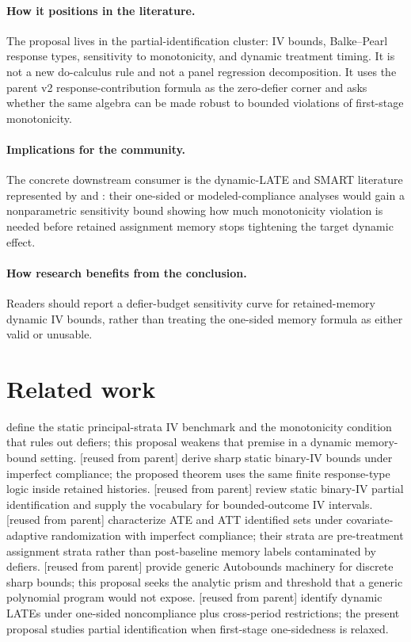\documentclass[11pt]{article}
\theoremstyle{definition}
\theoremstyle{plain}
\theoremstyle{remark}
\begin{document}
\paragraph{How it positions in the literature.}
The proposal lives in the partial-identification cluster: IV bounds, Balke--Pearl response types, sensitivity to monotonicity, and dynamic treatment timing.  It is not a new do-calculus rule and not a panel regression decomposition.  It uses the parent v2 response-contribution formula as the zero-defier corner and asks whether the same algebra can be made robust to bounded violations of first-stage monotonicity.

\paragraph{Implications for the community.}
The concrete downstream consumer is the dynamic-LATE and SMART literature represented by \citet{SojitraSyrgkanis2024} and \citet{ArtmanBhattacharyaErtefaieLynchMcKayJohnson2024}: their one-sided or modeled-compliance analyses would gain a nonparametric sensitivity bound showing how much monotonicity violation is needed before retained assignment memory stops tightening the target dynamic effect.

\paragraph{How research benefits from the conclusion.}
Readers should report a defier-budget sensitivity curve for retained-memory dynamic IV bounds, rather than treating the one-sided memory formula as either valid or unusable.

\section{Related work}
\citet{AngristImbensRubin1996} define the static principal-strata IV benchmark and the monotonicity condition that rules out defiers; this proposal weakens that premise in a dynamic memory-bound setting.  \citet{BalkePearl1997} [reused from parent] derive sharp static binary-IV bounds under imperfect compliance; the proposed theorem uses the same finite response-type logic inside retained histories.  \citet{SwansonHernanMillerRobinsRichardson2018} [reused from parent] review static binary-IV partial identification and supply the vocabulary for bounded-outcome IV intervals.  \citet{BugniGaoObradovicVelez2024} [reused from parent] characterize ATE and ATT identified sets under covariate-adaptive randomization with imperfect compliance; their strata are pre-treatment assignment strata rather than post-baseline memory labels contaminated by defiers.  \citet{DuarteFinkelsteinKnoxMummoloShpitser2024} [reused from parent] provide generic Autobounds machinery for discrete sharp bounds; this proposal seeks the analytic prism and threshold that a generic polynomial program would not expose.  \citet{SojitraSyrgkanis2024} [reused from parent] identify dynamic LATEs under one-sided noncompliance plus cross-period restrictions; the present proposal studies partial identification when first-stage one-sidedness is relaxed.
\end{document}

